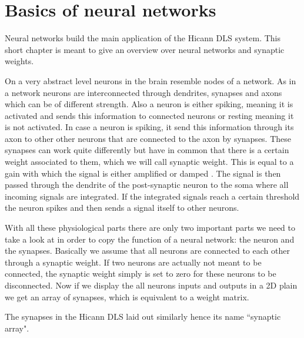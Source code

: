\chapter{Basics of neural networks}
\label{chapter:networks}

Neural networks build the main application of the Hicann DLS system. This short chapter is meant to give an overview over neural networks and synaptic weights.

On a very abstract level neurons in the brain resemble nodes of a network.
As in a network neurons are interconnected through dendrites, synapses and axons which can be of different strength. 
Also a neuron is either spiking, meaning it is activated and sends this information to connected neurons or resting meaning it is not activated.
In case a neuron is spiking, it send this information through its axon to other other neurons that are connected to the axon by synapses.
These synapses can work quite differently but have in common that there is a certain weight associated to them, which we will call synaptic weight.
This is equal to a gain with which the signal is either amplified or damped .
The signal is then passed through the dendrite of the post-synaptic neuron to the soma where all incoming signals are integrated.
If the integrated signals reach a certain threshold the neuron spikes and then sends a signal itself to other neurons.

With all these physiological parts there are only two important parts we need to take a look at in order to copy the function of a neural network: the neuron and the synapses.
Basically we assume that all neurons are connected to each other through a synaptic weight.
If two neurons are actually not meant to be connected, the synaptic weight simply is set to zero for these neurons to be disconnected.
Now if we display the all neurons inputs and outputs in a 2D plain we get an array of synapses, which is equivalent to a weight matrix.

The synapses in the Hicann DLS laid out similarly hence its name ``synaptic array".
